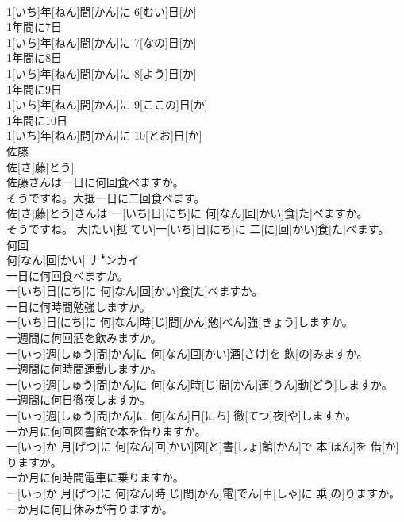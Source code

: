 \documentclass[8pt]{extreport}
\begin{document}
\begin{CJK}{UTF8}{min}
\\	1[いち]年[ねん]間[かん]に 6[むい]日[か]
\\	1年間に7日	
\\	1[いち]年[ねん]間[かん]に 7[なの]日[か]
\\	1年間に8日	
\\	1[いち]年[ねん]間[かん]に 8[よう]日[か]
\\	1年間に9日	
\\	1[いち]年[ねん]間[かん]に 9[ここの]日[か]
\\	1年間に10日	
\\	1[いち]年[ねん]間[かん]に 10[とお]日[か]
\\	佐藤	
\\	佐[さ]藤[とう]	
\\	佐藤さんは一日に何回食べますか。 
\\	そうですね。大抵一日に二回食べます。	
\\	佐[さ]藤[とう]さんは 一[いち]日[にち]に 何[なん]回[かい]食[た]べますか。 
\\	そうですね。 大[たい]抵[てい]一[いち]日[にち]に 二[に]回[かい]食[た]べます。
\\	何回	
\\	何[なん]回[かい]	ナꜜンカイ
\\	一日に何回食べますか。	
\\	一[いち]日[にち]に 何[なん]回[かい]食[た]べますか。
\\	一日に何時間勉強しますか。	
\\	一[いち]日[にち]に 何[なん]時[じ]間[かん]勉[べん]強[きょう]しますか。
\\	一週間に何回酒を飲みますか。	
\\	一[いっ]週[しゅう]間[かん]に 何[なん]回[かい]酒[さけ]を 飲[の]みますか。
\\	一週間に何時間運動しますか。	
\\	一[いっ]週[しゅう]間[かん]に 何[なん]時[じ]間[かん]運[うん]動[どう]しますか。
\\	一週間に何日徹夜しますか。	
\\	一[いっ]週[しゅう]間[かん]に 何[なん]日[にち] 徹[てつ]夜[や]しますか。
\\	一か月に何回図書館で本を借りますか。	
\\	一[いっ]か 月[げつ]に 何[なん]回[かい]図[と]書[しょ]館[かん]で 本[ほん]を 借[か]りますか。
\\	一か月に何時間電車に乗りますか。	
\\	一[いっ]か 月[げつ]に 何[なん]時[じ]間[かん]電[でん]車[しゃ]に 乗[の]りますか。
\\	一か月に何日休みが有りますか。	

\end{CJK}
\end{document}
